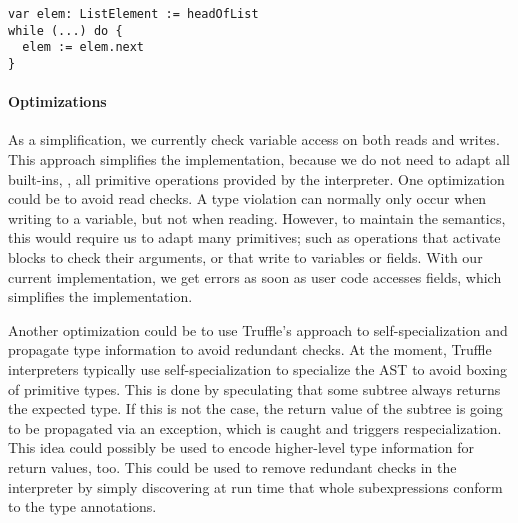 \begin{lstlisting}[caption={Example for dynamic type checks not corresponding to existing checks.},escapechar=|,label={ex:pathological-case},float,floatplacement=htb]
var elem: ListElement := headOfList
while (...) do {
  elem := elem.next
}
\end{lstlisting}

\paragraph{Optimizations}


As a simplification, we currently check variable access
on both reads and writes.
This approach simplifies the implementation, because we do not need to
adapt all built-ins, \ie,
all primitive operations provided by the interpreter.
One optimization could be to avoid read checks.
A type violation can normally only occur when writing to a variable,
but not when reading.
However, to maintain the semantics, this would require us to adapt
many primitives; 
such as operations that activate blocks to check their arguments,
or that write to variables or fields.
With our current implementation,
we get errors as soon as user code accesses fields,
which simplifies the implementation.


Another optimization could be to use Truffle's approach to 
self-specialization\citep{Wurthinger:2012:SelfOptAST}
and propagate type information to avoid redundant checks.
At the moment, Truffle interpreters typically use self-specialization to 
specialize the AST to avoid boxing of primitive types.
This is done by speculating that some subtree always returns the expected type.
If this is not the case, the return value of the subtree is going to be
propagated via an exception, which is caught and triggers respecialization.
This idea could possibly be used to encode higher-level type information for
return values, too.
This could be used to remove redundant checks in the interpreter
by simply discovering at run time that whole subexpressions conform to the
type annotations.
